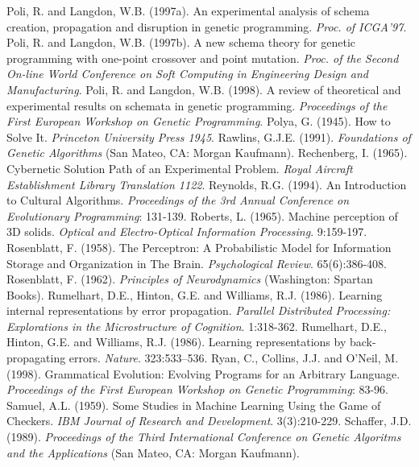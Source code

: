 \documentclass[spanish,a4paper,12pt,twoside]{report}
\begin{document}
\begin{thebibliography}{00}
   Poli, R. and Langdon, W.B. (1997a). An experimental analysis of schema creation, propagation and disruption in genetic programming. \emph{Proc. of ICGA'97}.
   Poli, R. and Langdon, W.B. (1997b). A new schema theory for genetic programming with one-point crossover and point mutation. \emph{Proc. of the Second On-line World Conference on Soft Computing in Engineering Design and Manufacturing}.
   Poli, R. and Langdon, W.B. (1998). A review of theoretical and experimental results on schemata in genetic programming. \emph{Proceedings of the First European Workshop on Genetic Programming}.
   Polya, G. (1945). How to Solve It. \emph{Princeton University Press 1945}.
   Rawlins, G.J.E. (1991). \emph{Foundations of Genetic Algorithms} (San Mateo, CA: Morgan Kaufmann).
   Rechenberg, I. (1965). Cybernetic Solution Path of an Experimental Problem. \emph{Royal Aircraft Establishment Library Translation 1122}.
   Reynolds, R.G. (1994). An Introduction to Cultural Algorithms. \emph{Proceedings of the 3rd Annual Conference on Evolutionary Programming}: 131-139.
   Roberts, L. (1965). Machine perception of 3D solids. \emph{Optical and Electro-Optical Information Processing}. 9:159-197.
   Rosenblatt, F. (1958). The Perceptron: A Probabilistic Model for Information Storage and Organization in The Brain. \emph{Psychological Review}. 65(6):386-408.
   Rosenblatt, F. (1962). \emph{Principles of Neurodynamics} (Washington: Spartan Books). 
   Rumelhart, D.E., Hinton, G.E. and Williams, R.J. (1986). Learning internal representations by error propagation. \emph{Parallel Distributed Processing: Explorations in the Microstructure of Cognition}. 1:318-362.
   Rumelhart, D.E., Hinton, G.E. and Williams, R.J. (1986). Learning representations by back-propagating errors. \emph{Nature}. 323:533–536.
   Ryan, C., Collins, J.J. and O'Neil, M. (1998). Grammatical Evolution: Evolving Programs for an Arbitrary Language. \emph{Proceedings of the First European Workshop on Genetic Programming}: 83-96.
   Samuel, A.L. (1959). Some Studies in Machine Learning Using the Game of Checkers. \emph{IBM Journal of Research and Development}. 3(3):210-229.
   Schaffer, J.D. (1989). \emph{Proceedings of the Third International Conference on Genetic Algoritms and the Applications} (San Mateo, CA: Morgan Kaufmann).

\end{thebibliography}
\end{document}
